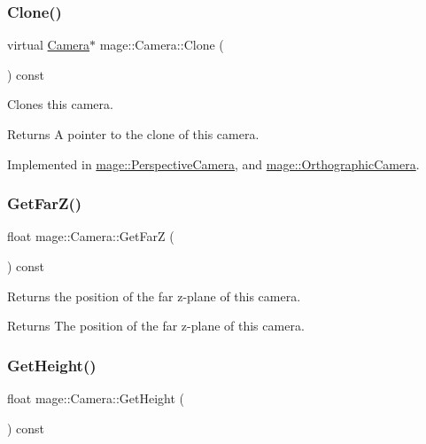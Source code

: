\subsubsection{\texorpdfstring{Clone()}{Clone()}}
{\footnotesize\ttfamily virtual \hyperlink{classmage_1_1_camera}{Camera}$\ast$ mage\+::\+Camera\+::\+Clone (\begin{DoxyParamCaption}{ }\end{DoxyParamCaption}) const\hspace{0.3cm}{\ttfamily [pure virtual]}}

Clones this camera.

\begin{DoxyReturn}{Returns}
A pointer to the clone of this camera. 
\end{DoxyReturn}


Implemented in \hyperlink{classmage_1_1_perspective_camera_a08eebf7f3ba10a46b4b23c0ded1192f2}{mage\+::\+Perspective\+Camera}, and \hyperlink{classmage_1_1_orthographic_camera_ae075c08e4af88f74212bf5c84d2e5b2a}{mage\+::\+Orthographic\+Camera}.

\hypertarget{classmage_1_1_camera_a7f293a8711086b3419fe3b4224ff2778}{}\label{classmage_1_1_camera_a7f293a8711086b3419fe3b4224ff2778} 
\subsubsection{\texorpdfstring{Get\+Far\+Z()}{GetFarZ()}}
{\footnotesize\ttfamily float mage\+::\+Camera\+::\+Get\+FarZ (\begin{DoxyParamCaption}{ }\end{DoxyParamCaption}) const}

Returns the position of the far z-\/plane of this camera.

\begin{DoxyReturn}{Returns}
The position of the far z-\/plane of this camera. 
\end{DoxyReturn}
\hypertarget{classmage_1_1_camera_a4c6c5e96085651ce29cd6e87543d21ec}{}\label{classmage_1_1_camera_a4c6c5e96085651ce29cd6e87543d21ec} 
\subsubsection{\texorpdfstring{Get\+Height()}{GetHeight()}}
{\footnotesize\ttfamily float mage\+::\+Camera\+::\+Get\+Height (\begin{DoxyParamCaption}{ }\end{DoxyParamCaption}) const}


